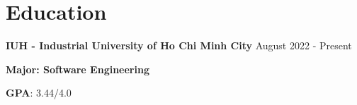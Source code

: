 \section{Education}

\thinrule

\textbf{IUH - Industrial University of Ho Chi Minh City} \hfill August 2022 - Present

\textbf{Major: Software Engineering}

\textbf{GPA}: 3.44/4.0
